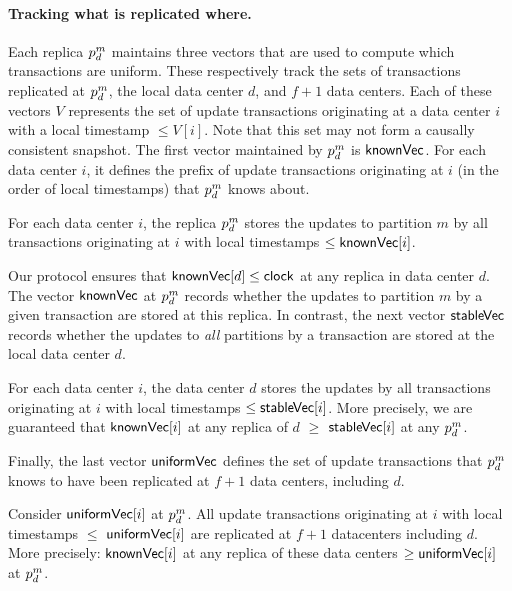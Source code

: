 \paragraph{Tracking what is replicated where.}  
Each replica $\partition^m_d$ maintains three vectors that are used to compute
which transactions are uniform. These respectively track the sets of
transactions replicated at $\partition^m_d$, the local data center $d$, and
$f+1$ data centers. Each of these vectors $V$ represents the set of update
transactions originating at a data center $i$ with a local timestamp $\le
V[i]$. Note that this set may not form a causally consistent snapshot. The first
vector maintained by $\partition^m_d$ is ${\sf knownVec}$. For each data
center $i$, it defines the prefix of update transactions originating at $i$ (in
the order of local timestamps) that $\partition^m_d$ knows about.
\begin{property}
\label{prop:knownvc}
For each data center $i$, the replica $\partition^m_d$ stores the updates to
partition $m$ by all transactions originating at $i$ with local timestamps
$\leq {\sf knownVec}[i]$.
\end{property}
Our protocol ensures that ${\sf knownVec}[d]\leq {\sf clock}$ at any replica in
data center $d$. The vector ${\sf knownVec}$ at $\partition^m_d$ records
whether the updates to partition $m$ by a given transaction are stored at this
replica. In contrast, the next vector ${\sf stableVec}$ records whether the
updates to {\em all} partitions by a transaction are stored at the local data
center $d$.
\begin{property}
\label{prop:stablevc}
For each data center $i$, the data center $d$ stores the updates by all
transactions originating at $i$ with local timestamps $\leq {\sf stableVec}[i]$.
More precisely, we are guaranteed that ${\sf knownVec}[i]$ at any replica of $d$ ${}\ge{}$
${\sf stableVec}[i]$ at any $\partition^m_d$.
\end{property}
Finally, the last vector ${\sf uniformVec}$ defines the set of update
transactions that $\partition^m_d$ knows to have been replicated at
$f+1$ data centers, including $d$.
\begin{property}
\label{prop:uniformity}
Consider ${\sf uniformVec}[i]$ at $\partition^m_d$. All update
transactions originating at $i$ with local timestamps $\leq$
${\sf uniformVec}[i]$ are replicated at $f+1$ datacenters including
$d$. More precisely: ${\sf knownVec}[i]$
at any replica of these data centers $\geq {\sf uniformVec}[i]$ at $\partition^m_d$.
\end{property}


